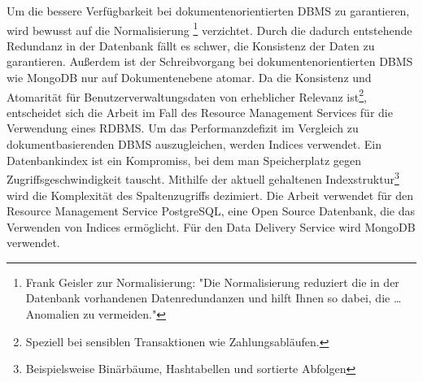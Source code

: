 Um die bessere Verfügbarkeit bei dokumentenorientierten DBMS zu garantieren, wird bewusst auf die Normalisierung
\footnote{Frank Geisler zur Normalisierung: "Die Normalisierung reduziert die in der Datenbank vorhandenen Datenredundanzen und hilft Ihnen so dabei, die \dots Anomalien zu vermeiden."\cite[S. 177]{DatenbankenFrankGeisler}}
verzichtet. Durch die dadurch entstehende Redundanz in der Datenbank fällt es schwer,
die Konsistenz der Daten zu garantieren. Außerdem ist der Schreibvorgang bei dokumentenorientierten
DBMS wie MongoDB nur auf Dokumentenebene atomar.\cite{MongoDBAtomaritaet} Da die Konsistenz und Atomarität für
Benutzerverwaltungsdaten von erheblicher Relevanz ist\footnote{Speziell bei sensiblen Transaktionen wie Zahlungsabläufen.}, 
entscheidet sich die Arbeit im Fall des Resource Management Services für die Verwendung eines RDBMS.
Um das Performanzdefizit im Vergleich zu dokumentbasierenden DBMS auszugleichen,
werden Indices verwendet. Ein Datenbankindex ist ein Kompromiss, bei dem
man Speicherplatz gegen Zugriffsgeschwindigkeit tauscht.\cite{YoutubePostgresIndexing}
Mithilfe der aktuell gehaltenen Indexstruktur\footnote{Beispielsweise Binärbäume, Hashtabellen und sortierte Abfolgen}
wird die Komplexität des Spaltenzugriffs dezimiert. Die Arbeit verwendet für den Resource Management Service
PostgreSQL, eine Open Source Datenbank, die das Verwenden von Indices ermöglicht. Für den Data Delivery Service
wird MongoDB verwendet. 

